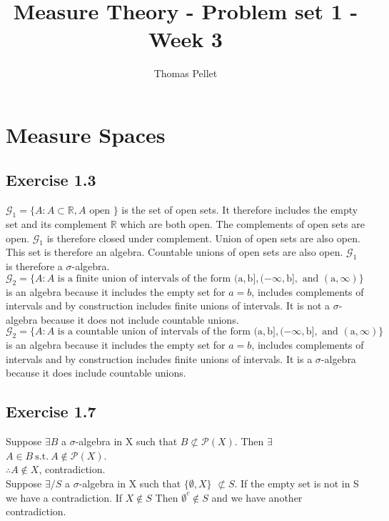 \documentclass[11pt]{article}
\title{Measure Theory - Problem set 1 - Week 3 }
\author{Thomas Pellet}
\numberwithin{equation}{section}
\theoremstyle{plain}
\theoremstyle{definition}
\def\ss{\subset}
\def\nss{\not \ss}
\newcommand{\st}{\ensuremath{\ \mathrm{s.t.}\ }}
\newcommand{\1}{\mathbbm 1}
\def\s{\sigma}
\newcommand{\RR}{\mathbb R}
\newcommand{\pP}{\mathcal P}
\begin{document}
\maketitle



\section{Measure Spaces}

\subsection*{Exercise 1.3}

$\mathcal{G}_{1}=\{A : A \subset \mathbb{R}, A \text { open }\}$ is the set of open sets. It therefore includes the empty set and its complement $\RR$ which are both open. The complements of open sets are open. $\mathcal{G}_{1}$ is therefore closed under complement. Union of open sets are also open. This set is therefore an algebra. Countable unions of open sets are also open. $\mathcal{G}_{1}$ is therefore a $\s$-algebra. \\
$\mathcal{G}_{2}=\{A : A \text { is a finite union of intervals of the form }(\mathrm{a}, \mathrm{b}],(-\infty, \mathrm{b}], \text { and }(\mathrm{a}, \infty)\}$ is an algebra because it includes the empty set for $a=b$, includes complements of intervals and by construction includes finite unions of intervals. It is not a $\s$-algebra because it does not include countable unions. \\

$\mathcal{G}_{2}=\{A : A \text { is a countable union of intervals of the form }(\mathrm{a}, \mathrm{b}],(-\infty, \mathrm{b}], \text { and }(\mathrm{a}, \infty)\}$ is an algebra because it includes the empty set for $a=b$, includes complements of intervals and by construction includes finite unions of intervals. It is a $\s$-algebra because it does include countable unions.

\subsection*{Exercise 1.7}
Suppose $\exists B$ a $\sigma$-algebra in X such that $B \nss \pP(X)$. Then $\exists$ $A \in B \st A \notin \pP(X)$. \\
$\therefore A \notin X$, contradiction. \\

Suppose $\exists / S$ a $\sigma$-algebra in X such that $\{\emptyset ,X\}$ $\nss S$. If the empty set is not in S we have a contradiction. If $X\notin S$ Then $\emptyset^c \notin S$ and we have another contradiction.
\end{document}
